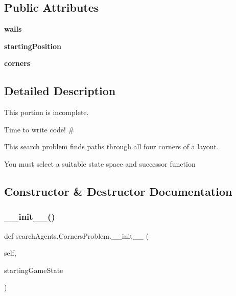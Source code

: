 \subsection*{Public Attributes}
\begin{DoxyCompactItemize}
\item 
\mbox{\label{classsearch_agents_1_1_corners_problem_a7afbc50121078e7ee8e67e6c5b4871e9}} 
{\bfseries walls}
\item 
\mbox{\label{classsearch_agents_1_1_corners_problem_a8b95bc921aa406bbd5aa8249aa73f932}} 
{\bfseries starting\+Position}
\item 
\mbox{\label{classsearch_agents_1_1_corners_problem_a3a92389a3705e5feac95cb72d8e681aa}} 
{\bfseries corners}
\end{DoxyCompactItemize}


\subsection{Detailed Description}
This portion is incomplete. 

Time to write code! \#\begin{DoxyVerb}This search problem finds paths through all four corners of a layout.

You must select a suitable state space and successor function
\end{DoxyVerb}
 

\subsection{Constructor \& Destructor Documentation}
\mbox{\label{classsearch_agents_1_1_corners_problem_a8f0a2bae690d6d0ee6ddb6515ef477d9}} 
\subsubsection{\texorpdfstring{\+\_\+\+\_\+init\+\_\+\+\_\+()}{\_\_init\_\_()}}
{\footnotesize\ttfamily def search\+Agents.\+Corners\+Problem.\+\_\+\+\_\+init\+\_\+\+\_\+ (\begin{DoxyParamCaption}\item[{}]{self,  }\item[{}]{starting\+Game\+State }\end{DoxyParamCaption})}

